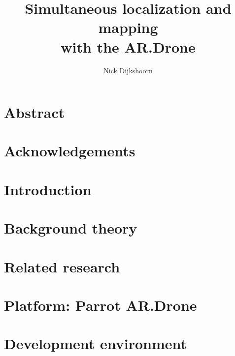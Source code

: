 \documentclass[twoside]{uva-bachelor-thesis}
\title{Simultaneous localization and mapping \\ \vspace{0.5cm} with the AR.Drone}
\author{Nick Dijkshoorn}
\begin{document}
\maketitle





\chapter*{Abstract}




\chapter*{Acknowledgements}




\tableofcontents
{}



\chapter{Introduction}
\label{chapter:introduction}




\chapter{Background theory}
\label{chapter:background-theory}



\chapter{Related research}
\label{chapter:related-research}




\chapter{Platform: Parrot AR.Drone}
\label{chapter:platform}




\chapter{Development environment}
\label{chapter:development-environment}

\end{document}

